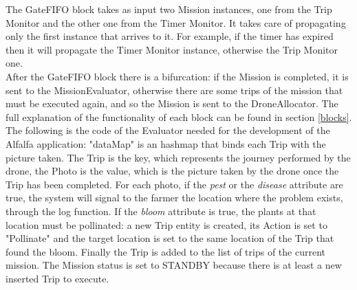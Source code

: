 The GateFIFO block takes as input two Mission instances, one from the Trip Monitor and the other one from the Timer Monitor.
It takes care of propagating only the first instance that arrives to it.
For example, if the timer has expired then it will propagate the Timer Monitor instance, otherwise the Trip Monitor one.
\\

After the GateFIFO block there is a bifurcation:
if the Mission is completed, it is sent to the MissionEvaluator, otherwise there are some trips of the mission that must be executed again, and so the Mission is sent to the DroneAllocator.
The full explanation of the functionality of each block can be found in section \ref{blocks}.
\\

The following is the code of the Evaluator needed for the development of the Alfalfa\cite{alfalfa} application:
"dataMap" is an hashmap that binds each Trip with the picture taken. The Trip is the key, which represents the journey performed by the drone, the Photo is the value, which is the picture taken by the drone once the Trip has been completed.
For each photo, if the \textit{pest} or the \textit{disease} attribute are true, the system will signal to the farmer the location where the problem exists, through the log function.
If the \textit{bloom} attribute is true, the plants at that location must be pollinated: a new Trip entity is created, its Action is set to "Pollinate" and the target location is set to the same location of the Trip that found the bloom.
Finally the Trip is added to the list of trips of the current mission.
The Mission status is set to STANDBY because there is at least a new inserted Trip to execute.
\\


